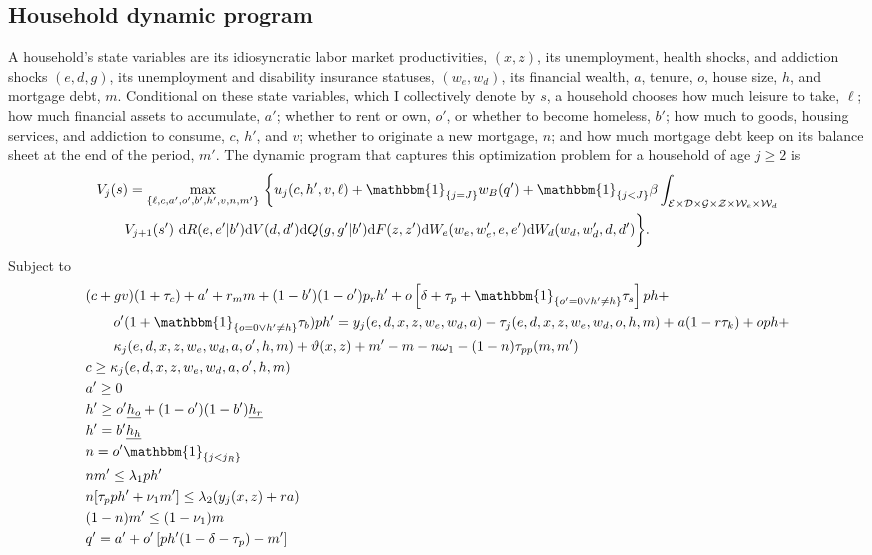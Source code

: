 \documentclass[parskip=full]{article}
\newcommand{\indicator}[1]{\mathbbm{1}_{\left\{ {#1} \right\} }}
\begin{document}
\subsection{Household dynamic program}
A household's state variables are its idiosyncratic labor market productivities, $(x,z)$, its unemployment, health shocks, and addiction shocks $(e,d,g)$, its unemployment and disability insurance statuses, $(w_{e},w_{d})$, its financial wealth, $a$, tenure, $o$, house size, $h$, and mortgage debt, $m$. Conditional on these state variables, which I collectively denote by $s$, a household chooses how much leisure to take, $\ell$; how much financial assets to accumulate, $a'$; whether to rent or own, $o'$, or whether to become homeless, $b'$; how much to goods, housing services, and addiction to consume, $c$, $h'$, and $v$; whether to originate a new mortgage, $n$; and how much mortgage debt keep on its balance sheet at the end of the period, $m'$. The dynamic program that captures this optimization problem for a household of age $j\geq 2$ is
\begin{align}
  & V_{j}(s)=\max_{\{\ell,c,a',o',b',h',v,n,m'\}}\ \biggr\{u_{j}(c,h',v,\ell) +\indicator{j=J}w_B(q') + \indicator{j<J}\beta \int_{\mathcal{E} \times \mathcal{D}\times \mathcal{G}\times \mathcal{Z}\times\mathcal{W}_{e}\times\mathcal{W}_{d}} \label{eq:vf}\\ &\qquad V_{j+1}(s')\ \mathrm{d}R(e,e'|b')\mathrm{d}V(d,d')\mathrm{d}Q(g,g'|b')\mathrm{d}F(z,z')\mathrm{d}W_{e}(w_{e},w_{e}',e,e')\mathrm{d}W_{d}(w_{d},w_{d}',d,d')\biggr\}. \notag
\end{align}
Subject to
\begin{align}
  & (c+gv) (1+\tau_{c}) + a' + r_m m + (1-b')(1-o')p_{r}h' + 
  o\left[\delta + \tau_p + \indicator{o'=0\lor h'\neq h}\tau_s\right]ph + \label{eq:vf_bc}\\ & \qquad o' (1+\indicator{o=0\lor h'\neq h}\tau_b)ph'
  = y_{j}(e,d,x,z,w_{e},w_{d},a)-\tau_j(e,d,x,z,w_{e},w_{d},o,h,m) + a(1-r\tau_k)+ oph +\notag \\ &\qquad \kappa_{j}(e,d,x,z,w_{e},w_{d},a,o',h,m)+\vartheta(x,z) + m'-m- n\omega_1 - (1-n)\tau_{pp}(m,m')\notag\\
  & c\geq \kappa_{j}(e,d,x,z,w_{e},w_{d},a,o',h,m)\label{eq:c_noneg}\\
  & a'\geq 0\label{eq:a_noneg}\\
  & h' \geq o'\underline{{h}_o} + (1-o')(1-b')\underline{{h}_r}\label{eq:vf_minhouse}\\
  & h' = b'\underline{{h}_h}\label{eq:vf_minhouse_homeless}\\
  & n=o'\indicator{j<j_R}\label{eq:vf_orig}\\
  & n m' \leq \lambda_1 ph'\label{eq:vf_ltv}\\
  & n [\tau_p p h' + \nu_1 m'] \leq \lambda_2 (y_j(x,z) + ra)\label{eq:vf_gds}\\
  & (1-n)m'\leq (1-\nu_1) m \label{eq:vf_repay}\\
  & q' = a' + o' \left[p h'(1-\delta-\tau_p)-m'\right] \label{eq:networth}
\end{align}
\end{document}

